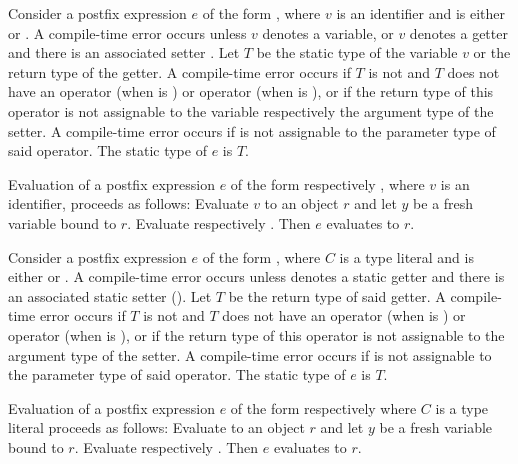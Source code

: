 \documentclass[makeidx]{article}
\begin{document}
{\LMHash{}%
Consider a postfix expression $e$ of the form ,
where $v$ is an identifier and \op{} is either \lit{++} or \lit{-{}-}.
A compile-time error occurs unless $v$ denotes a variable,
or $v$ denotes a getter and there is an associated setter .
Let $T$ be the static type of the variable $v$ or the return type of the getter.
A compile-time error occurs if $T$ is not \DYNAMIC{}
and $T$ does not have an operator \lit{+} (when \op{} is \lit{++})
or operator \lit{-} (when \op{} is \lit{-{}-}),
or if the return type of this operator is not assignable to
the variable respectively the argument type of the setter.
A compile-time error occurs if  is not assignable to
the parameter type of said operator.
The static type of $e$ is $T$.

\LMHash{}%
Evaluation of a postfix expression $e$
of the form  respectively ,
where $v$ is an identifier, proceeds as follows:
Evaluate $v$ to an object $r$ and let $y$ be a fresh variable bound to $r$.
Evaluate  respectively .
Then $e$ evaluates to $r$.

\EndCase

\LMHash{}%
Consider a postfix expression $e$ of the form ,
where $C$ is a type literal and \op{} is either \lit{++} or \lit{-{}-}.
A compile-time error occurs unless  denotes a static getter
and there is an associated static setter 
().
Let $T$ be the return type of said getter.
A compile-time error occurs if $T$ is not \DYNAMIC{}
and $T$ does not have an operator \lit{+} (when \op{} is \lit{++})
or operator \lit{-} (when \op{} is \lit{-{}-}),
or if the return type of this operator is not assignable to
the argument type of the setter.
A compile-time error occurs if  is not assignable to
the parameter type of said operator.
The static type of $e$ is $T$.

\LMHash{}%
Evaluation of a postfix expression $e$
of the form  respectively 
where $C$ is a type literal proceeds as follows:
Evaluate  to an object $r$
and let $y$ be a fresh variable bound to $r$.
Evaluate  respectively .
Then $e$ evaluates to $r$.
\EndCase

}
\end{document}
